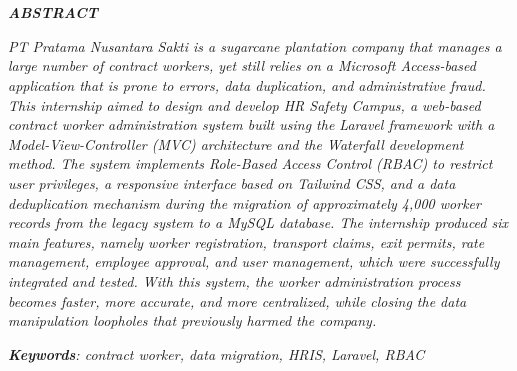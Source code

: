 \chapter*{\MakeUppercase{\textit{\judulInggris}}}
\singlespacing
\begin{center}
    
    \vspace{-4em}
    
    \penulis
    
	\bigskip
    
    \textit{\textbf{ABSTRACT}}
    
\end{center}


\vspace*{0.2cm}
{
	\setlength{\parindent}{0pt}

	\bigskip
	\bigskip

\textit{PT Pratama Nusantara Sakti is a sugarcane plantation company that manages
a large number of contract workers, yet still relies on a Microsoft Access-based
application that is prone to errors, data duplication, and administrative fraud.
This internship aimed to design and develop HR Safety Campus, a web-based contract
worker administration system built using the Laravel framework with a
Model-View-Controller (MVC) architecture and the Waterfall development method.
The system implements Role-Based Access Control (RBAC) to restrict user
privileges, a responsive interface based on Tailwind CSS, and a data
deduplication mechanism during the migration of approximately 4,000 worker
records from the legacy system to a MySQL database. The internship produced six
main features, namely worker registration, transport claims, exit permits, rate
management, employee approval, and user management, which were successfully
integrated and tested. With this system, the worker administration process
becomes faster, more accurate, and more centralized, while closing the data
manipulation loopholes that previously harmed the company.}
	\bigskip
 
	\textit{\textbf{Keywords}: contract worker, data migration, HRIS, Laravel, RBAC}	
} 

\onehalfspacing
